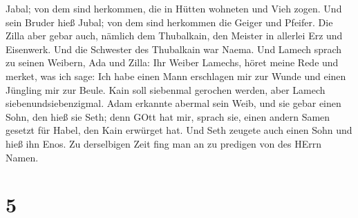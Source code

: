 Jabal; von dem sind herkommen, die in Hütten wohneten und Vieh zogen.
 Und sein Bruder hieß Jubal; von dem sind herkommen die
Geiger und Pfeifer.  Die Zilla aber gebar auch, nämlich dem
Thubalkain, den Meister in allerlei Erz und Eisenwerk. Und die Schwester
des Thubalkain war Naema.  Und Lamech sprach zu seinen
Weibern, Ada und Zilla: Ihr Weiber Lamechs, höret meine Rede und merket,
was ich sage: Ich habe einen Mann erschlagen mir zur Wunde und einen
Jüngling mir zur Beule.  Kain soll siebenmal gerochen
werden, aber Lamech siebenundsiebenzigmal.  Adam erkannte
abermal sein Weib, und sie gebar einen Sohn, den hieß sie Seth; denn
GOtt hat mir, sprach sie, einen andern Samen gesetzt für Habel, den Kain
erwürget hat.  Und Seth zeugete auch einen Sohn und hieß
ihn Enos. Zu derselbigen Zeit fing man an zu predigen von des HErrn
Namen.

\hypertarget{section-4}{%
\section{5}\label{section-4}}

